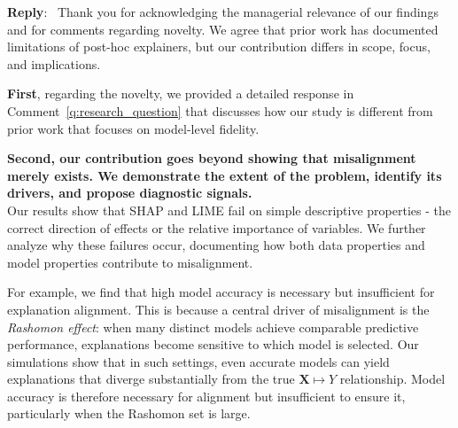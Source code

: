\documentclass[11pt]{article}
\newcounter{se}[section]
\newcounter{reviewer}
\newcounter{point}[reviewer]
\newenvironment{reply}
 {\par\medskip \noindent \begin{sf}\textbf{Reply}:\ }
 {\medskip \end{sf}}
\begin{document}
\begin{reply}
Thank you for acknowledging the managerial relevance of our findings and for comments regarding novelty. We agree that prior work has documented limitations of post-hoc explainers, but our contribution differs in scope, focus, and implications.

\noindent\textbf{First}, regarding the novelty, we provided a detailed response in Comment~\ref{q:research_question} that discusses how our study is different from prior work that focuses on model-level fidelity.



\noindent\textbf{Second, our contribution goes beyond showing that misalignment merely exists. We demonstrate the extent of the problem, identify its drivers, and propose diagnostic signals.}\medskip\\
Our results show that SHAP and LIME fail on simple descriptive properties - the correct direction of effects or the relative importance of variables. We further analyze why these failures occur, documenting how both data properties and model properties contribute to misalignment. %

For example, we find that high model accuracy is necessary but insufficient for explanation alignment. This is because a central driver of misalignment is the \emph{Rashomon effect}: when many distinct models achieve comparable predictive performance, explanations become sensitive to which model is selected. Our simulations show that in such settings, even accurate models can yield explanations that diverge substantially from the true $\mathbf{X} \mapsto Y$ relationship. Model accuracy is therefore necessary for alignment but insufficient to ensure it, particularly when the Rashomon set is large.


\end{reply}
\end{document}

